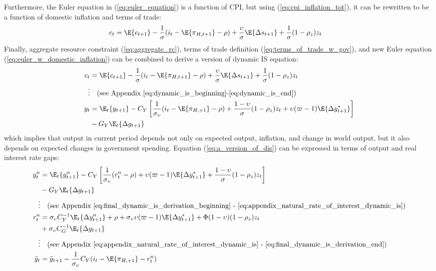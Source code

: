 Furthermore, the Euler equation in (\ref{eq:euler_equation}) is a function of CPI, but using (\ref{eq:cpi_inflation_tot}), it can be rewritten to be a function of domestic inflation and terms of trade:
\begin{align}
    c_t &= \E\{ c_{t+1}\} - \frac{1}{\sigma}(i_t - \E \{ \pi_{H,t+1}\} - \rho) + \frac{\upsilon}{\sigma}\E \{ \Delta s_{t+1} \} + \frac{1}{\sigma}(1-\rho_z)z_t \label{eq:euler_w_domestic_inflation}
\end{align}
Finally, aggregate resource constraint (\ref{eq:aggregate_rc}), terms of trade definition (\ref{eq:terms_of_trade_w_gov}), and new Euler equation (\ref{eq:euler_w_domestic_inflation}) can be combined to derive a version of dynamic IS equation:
\begin{align}
    c_t &= \E\{ c_{t+1}\} - \frac{1}{\sigma}(i_t - \E \{ \pi_{H,t+1}\} - \rho) + \frac{\upsilon}{\sigma}\E \{ \Delta s_{t+1} \} + \frac{1}{\sigma}(1-\rho_z)z_t \\
    \vdots & \quad \text{(see Appendix \ref{eq:dynamic_is_beginning}-\ref{eq:dynamic_is_end})} \nonumber \\
    y_t  &= \E_t \{y_{t+1}\} - C_Y\left[\frac{1}{\sigma_\upsilon}(i_t - \E \{ \pi_{H,+1}\} - \rho) + \frac{1-\upsilon}{\sigma} (1-\rho_z)z_t + \upsilon (\varpi - 1)\E \{\Delta y_{t+1}^* \}\right] \nonumber \\ 
    & - G_Y \E_t \{\Delta g_{t+1}\} \label{eq:a_version_of_dis}
\end{align}
which implies that output in current period depends not only on expected output, inflation, and change in world output, but it also depends on expected changes in government spending. Equation (\ref{eq:a_version_of_dis}) can be expressed in terms of output and real interest rate gaps:
\begin{align}
    y^n_t  &= \E_t \{y^n_{t+1}\} - C_Y\left[\frac{1}{\sigma_\upsilon}(r^n_t - \rho) + \upsilon (\varpi - 1)\E \{\Delta y_{t+1}^* \}  + \frac{1-\upsilon}{\sigma} (1-\rho_z)z_t\right] \nonumber \\
    &- G_Y \E_t \{ \Delta g_{t+1} \}\\
    \vdots & \quad \text{(see Appendix \ref{eq:final_dynamic_is_derivation_beginning} - \ref{eq:appendix_natural_rate_of_interest_dynamic_is})} \nonumber \\
    r^n_t  &= \sigma_\upsilon C_Y^{-1} \E_t \{\Delta y^n_{t+1}\} + \rho + \sigma_\upsilon \upsilon (\varpi - 1)\E \{\Delta y_{t+1}^* \}  + \Phi (1-\upsilon)(1-\rho_z)z_t \nonumber \\ 
    &+ \sigma_\upsilon C_G^{-1}\E_t \{ \Delta g_{t+1} \} \label{eq:natural_rate_of_interest_dynamic_is}\\
    \vdots & \quad \text{(see Appendix \ref{eq:appendix_natural_rate_of_interest_dynamic_is} - \ref{eq:final_dynamic_is_derivation_end})} \nonumber \\
    \tilde{y}_t &= \tilde{y}_{t+1} - \frac{1}{\sigma_\upsilon}C_Y(i_t - \E \{ \pi_{H,+1}\} - r^n_t) \label{eq:dynamic_is}
\end{align}
